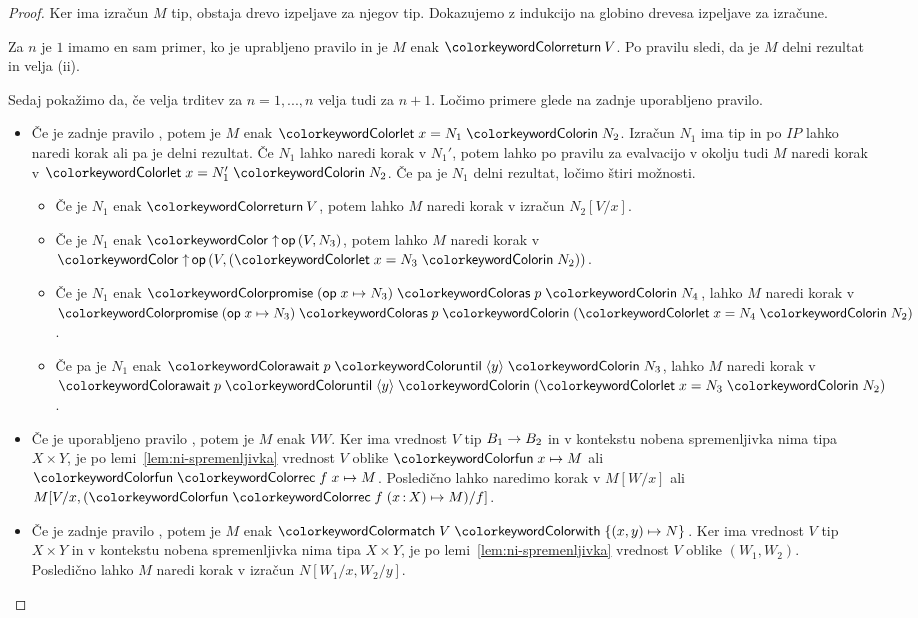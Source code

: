 \begin{proof}
	Ker ima izračun $M$ tip, obstaja drevo izpeljave za njegov tip.
	Dokazujemo z indukcijo na globino drevesa izpeljave za izračune.
	
	Za $n$ je $1$ imamo en sam primer, ko je uprabljeno pravilo  in je $M$ enak $\tmreturn{V}$. 
	Po pravilu  sledi, da je $M$ delni rezultat in velja (ii).
	
	Sedaj pokažimo da, če velja trditev za $n = 1,...,n$ velja tudi za $n+1$.
	Ločimo primere glede na zadnje uporabljeno pravilo.
	
	
	\begin{itemize}
		
		\item Če je zadnje pravilo , potem je $M$ enak $\tmlet{x}{N_1}{N_2}$.
		Izračun $N_1$ ima tip in po $IP$ lahko naredi korak ali pa je delni rezultat. Če $N_1$ lahko naredi korak v $N_1'$, potem lahko po pravilu za evalvacijo v okolju tudi $M$ naredi korak v $\tmlet{x}{N_1'}{N_2}$.
		Če pa je $N_1$ delni rezultat, ločimo štiri možnosti. 
		\begin{itemize}
			\item Če je $N_1$ enak $\tmreturn{V}$, potem lahko $M$ naredi korak v izračun $N_2[V/x]$.
			\item Če je $N_1$ enak $\tmopout{op}{V}{N_3}$, potem lahko $M$ naredi korak v $\tmopout{op}{V}{(\tmlet{x}{N_3}{N_2})}$.
			\item Če je $N_1$ enak $\tmwith{op}{x}{N_3}{p}{N_4}$, lahko $M$ naredi korak v $\tmwith{op}{x}{N_3}{p}{(\tmlet{x}{N_4}{N_2})}$.
			\item Če pa je $N_1$ enak $\tmawait{p}{y}{N_3}$, lahko $M$ naredi korak v $\tmawait{p}{y}{(\tmlet{x}{N_3}{N_2})}$.
		\end{itemize}
	
		\item Če je uporabljeno pravilo , potem je $M$ enak $V W$. Ker ima vrednost $V$ tip $B_1 \to B_2$ in v kontekstu nobena spremenljivka nima tipa $X \times Y$, je po lemi~\ref{lem:ni-spremenljivka} vrednost $V$ oblike $\tmfunano{x}{M}$ ali $\tmfunrecano{f}{x}{M}$. Posledično lahko naredimo korak v $M[W/x]$ ali $M[V/x, (\tmfunrec{f}{x \of X}{M})/f]$.
		
		\item Če je zadnje pravilo , potem je $M$ enak $\tmmatch{V}{(x,y) \mapsto N}$. Ker ima vrednost $V$ tip $X \times Y$ in v kontekstu nobena spremenljivka nima tipa $X \times Y$, je po lemi~\ref{lem:ni-spremenljivka} vrednost $V$ oblike $(W_1,W_2)$. Posledično lahko $M$ naredi korak v izračun $N[W_1/x,W_2/y]$.
		

\end{itemize}
\end{proof}
